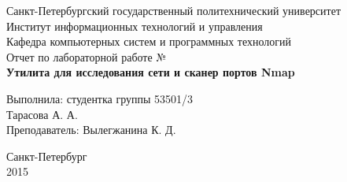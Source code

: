 \thispagestyle{empty}
\begin{center}
\large Санкт-Петербургский государственный политехнический университет\\
Институт информационных технологий и управления\\
Кафедра компьютерных систем и программных технологий\\
\vspace{65mm}
\Large Отчет по лабораторной работе №\\
\LARGE\textbf{Утилита для исследования сети и сканер портов Nmap}
\end{center}

\vspace{40mm}
\begin{flushright}
\large Выполнила: студентка группы 53501/3\\ Тарасова А. А.\\ Преподаватель: Вылегжанина К. Д.
\end{flushright}
\vspace{30mm}

\begin{center}
Санкт-Петербург\\ 2015
\end{center}